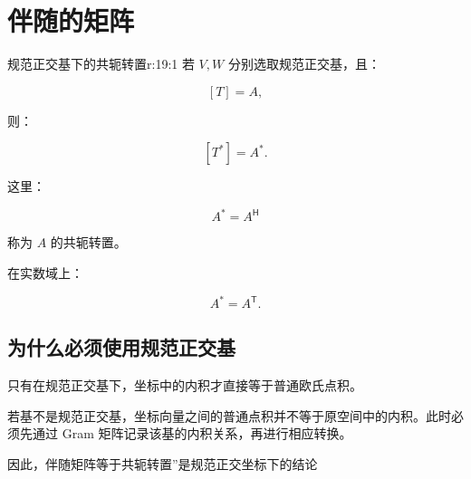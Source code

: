 
\chapter{伴随的矩阵}


\begin{jprop}{规范正交基下的共轭转置}{r:19:1}
若 $V,W$ 分别选取规范正交基，且：

\[
[T]=A,
\]

则：

\[
[T^*]=A^*.
\]

这里：

\[
A^*={A}^{\mathsf H}
\]

称为 $A$ 的共轭转置。

在实数域上：

\[
A^*=A^{\mathsf T}.
\]
\end{jprop}

\section{为什么必须使用规范正交基}

只有在规范正交基下，坐标中的内积才直接等于普通欧氏点积。

若基不是规范正交基，坐标向量之间的普通点积并不等于原空间中的内积。此时必须先通过 Gram 矩阵记录该基的内积关系，再进行相应转换。

因此，伴随矩阵等于共轭转置”是规范正交坐标下的结论
